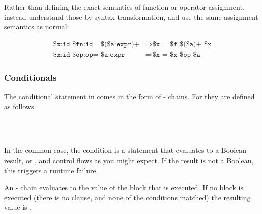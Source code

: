 Rather than defining the exact semantics of function or operator assignment,
instead understand those by syntax transformation, and use the same assignment
semantics as normal:

\begin{align*}
    \texttt{\$x:id \$fn:id= \$(\$a:expr)+} &\Rightarrow \texttt{\$x = \$f \$(\$a)+ \$x} \\ %
    \texttt{\$x:id \$op:op= \$a:expr} & \Rightarrow \texttt{\$x = \$x \$op \$a} %
\end{align*}

\subsubsection{Conditionals}

The conditional statement in \Trilogy{} comes in the form of -
chains. For \Prose{} they are defined as follows.

\begin{bnf*}
     \\
     \\
\end{bnf*}

In the common case, the condition is a statement that evaluates to a Boolean
result,  or , and control flows as you might expect.
If the result is not a Boolean, this triggers a runtime failure.

An - chain evaluates to the value of the block that is executed.
If no block is executed (there is no  clause, and none of the
conditions matched) the resulting value is .

